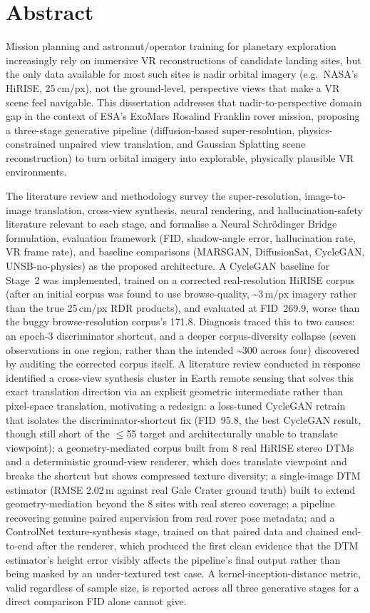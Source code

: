 \chapter*{Abstract}

Mission planning and astronaut/operator training for planetary exploration increasingly rely on immersive VR reconstructions of candidate landing sites, but the only data available for most such sites is nadir orbital imagery (e.g.\ NASA's HiRISE, 25\,cm/px), not the ground-level, perspective views that make a VR scene feel navigable. This dissertation addresses that nadir-to-perspective domain gap in the context of ESA's ExoMars Rosalind Franklin rover mission, proposing a three-stage generative pipeline (diffusion-based super-resolution, physics-constrained unpaired view translation, and Gaussian Splatting scene reconstruction) to turn orbital imagery into explorable, physically plausible VR environments.

The literature review and methodology survey the super-resolution, image-to-image translation, cross-view synthesis, neural rendering, and hallucination-safety literature relevant to each stage, and formalise a Neural Schr\"{o}dinger Bridge formulation, evaluation framework (FID, shadow-angle error, hallucination rate, VR frame rate), and baseline comparisons (MARSGAN, DiffusionSat, CycleGAN, UNSB-no-physics) as the proposed architecture. A CycleGAN baseline for Stage~2 was implemented, trained on a corrected real-resolution HiRISE corpus (after an initial corpus was found to use browse-quality, \textasciitilde3\,m/px imagery rather than the true 25\,cm/px RDR products), and evaluated at FID~269.9, worse than the buggy browse-resolution corpus's 171.8. Diagnosis traced this to two causes: an epoch-3 discriminator shortcut, and a deeper corpus-diversity collapse (seven observations in one region, rather than the intended \textasciitilde300 across four) discovered by auditing the corrected corpus itself. A literature review conducted in response identified a cross-view synthesis cluster in Earth remote sensing that solves this exact translation direction via an explicit geometric intermediate rather than pixel-space translation, motivating a redesign: a loss-tuned CycleGAN retrain that isolates the discriminator-shortcut fix (FID~95.8, the best CycleGAN result, though still short of the $\leq$55 target and architecturally unable to translate viewpoint); a geometry-mediated corpus built from 8 real HiRISE stereo DTMs and a deterministic ground-view renderer, which does translate viewpoint and breaks the shortcut but shows compressed texture diversity; a single-image DTM estimator (RMSE 2.02\,m against real Gale Crater ground truth) built to extend geometry-mediation beyond the 8 sites with real stereo coverage; a pipeline recovering genuine paired supervision from real rover pose metadata; and a ControlNet texture-synthesis stage, trained on that paired data and chained end-to-end after the renderer, which produced the first clean evidence that the DTM estimator's height error visibly affects the pipeline's final output rather than being masked by an under-textured test case. A kernel-inception-distance metric, valid regardless of sample size, is reported across all three generative stages for a direct comparison FID alone cannot give.

